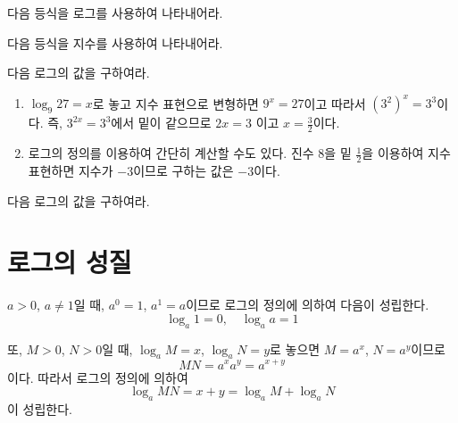 \documentclass[11pt, a4paper]{book}
\begin{document}
\begin{sample}
\end{sample}

\begin{problem}
	다음 등식을 로그를 사용하여 나타내어라.
\end{problem}

\begin{problem}
	다음 등식을 지수를 사용하여 나타내어라.
\end{problem}
\begin{example}
	다음 로그의 값을 구하여라.
	\begin{solution}
		\begin{enumerate}[label=(\arabic*)]
			\item $\log_{9}27=x$로 놓고 지수 표현으로 변형하면  $9^{x}=27$이고 따라서 $(3^{2})^{x}=3^{3}$이다. 즉, $3^{2x}=3^{3}$에서  밑이 같으므로   $2x=3$ 이고 $x=\frac{3}{2}$이다.
			\item 로그의 정의를 이용하여 간단히 계산할 수도 있다. 진수 $8$을 밑 $\frac{1}{2}$을 이용하여 지수표현하면 지수가 $-3$이므로 구하는 값은 $-3$이다.
		\end{enumerate}
	\end{solution}
\end{example}

\begin{problem}
	 다음 로그의 값을 구하여라.
\end{problem}

\section{로그의 성질}

$a>0$, $a\ne 1$일 때, $a^{0}=1$, $a^{1}=a$이므로 로그의 정의에 의하여 다음이 성립한다.
\[
\log_{a}1=0, \quad \log_{a}a = 1
\]

또, $M>0$, $N>0$일 때, $\log_{a}M=x$, $\log_{a}N=y$로 놓으면 $M=a^{x}$, $N=a^{y}$이므로
\[
MN=a^{x}a^{y}=a^{x+y}
\]
이다. 따라서 로그의 정의에 의하여
\[
\log_{a}MN=x+y=\log_{a}M+\log_{a}N
\]
이 성립한다.
\end{document}
